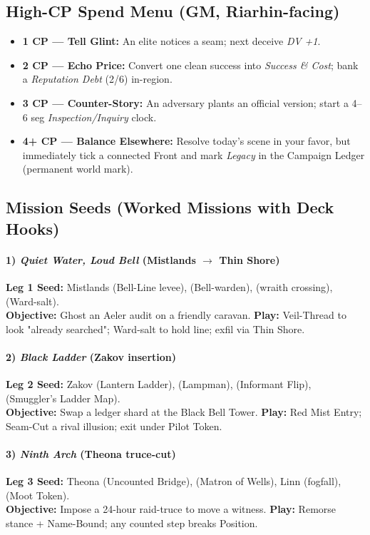 \subsection{High-CP Spend Menu (GM, Riarhin-facing)}
\begin{itemize}
  \item \textbf{1 CP — Tell Glint:} An elite notices a seam; next deceive \emph{DV +1}.
  \item \textbf{2 CP — Echo Price:} Convert one clean success into \emph{Success \& Cost}; bank a \emph{Reputation Debt} (2/6) in-region.
  \item \textbf{3 CP — Counter-Story:} An adversary plants an official version; start a 4–6 seg \emph{Inspection/Inquiry} clock.
  \item \textbf{4+ CP — Balance Elsewhere:} Resolve today's scene in your favor, but immediately tick a connected Front and mark \emph{Legacy} in the Campaign Ledger (permanent world mark).
\end{itemize}

\subsection{Mission Seeds (Worked Missions with Deck Hooks)}
\paragraph{1) \emph{Quiet Water, Loud Bell} (Mistlands $\to$ Thin Shore)}
\textbf{Leg 1 Seed:} Mistlands \SuitSpade{} (Bell-Line levee), \SuitHeart{} (Bell-warden), \SuitClub{} (wraith crossing), \SuitDiamond{} (Ward-salt). \\
\textbf{Objective:} Ghost an Aeler audit on a friendly caravan. \textbf{Play:} Veil-Thread to look "already searched"; Ward-salt to hold line; exfil via Thin Shore.

\paragraph{2) \emph{Black Ladder} (Zakov insertion)}
\textbf{Leg 2 Seed:} Zakov \SuitSpade{} (Lantern Ladder), \SuitHeart{} (Lampman), \SuitClub{} (Informant Flip), \SuitDiamond{} (Smuggler's Ladder Map). \\
\textbf{Objective:} Swap a ledger shard at the Black Bell Tower. \textbf{Play:} Red Mist Entry; Seam-Cut a rival illusion; exit under Pilot Token.

\paragraph{3) \emph{Ninth Arch} (Theona truce-cut)}
\textbf{Leg 3 Seed:} Theona \SuitSpade{} (Uncounted Bridge), \SuitHeart{} (Matron of Wells), Linn \SuitClub{} (fogfall), \SuitDiamond{} (Moot Token). \\
\textbf{Objective:} Impose a 24-hour raid-truce to move a witness. \textbf{Play:} Remorse stance + Name-Bound; any counted step breaks Position.


